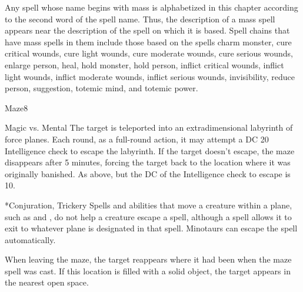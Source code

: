 \par Any spell whose name begins with mass is alphabetized in this chapter according to the second word of the spell name. Thus, the description of a mass spell appears near the description of the spell on which it is based. Spell chains that have mass spells in them include those based on the spells charm monster, cure critical wounds, cure light wounds, cure moderate wounds, cure serious wounds, enlarge person, heal, hold monster, hold person, inflict critical wounds, inflict light wounds, inflict moderate wounds, inflict serious wounds, invisibility, reduce person, suggestion, totemic mind, and totemic power.

\begin{spellsection}{Maze}{8}
    \begin{spellheader}
    \end{spellheader}
    \begin{spellcontent}
        \begin{spelltargetinginfo}
        \end{spelltargetinginfo}
        \begin{spelleffects}
            \begin{spellattack}{Magic vs. Mental}
                \spellsuccess The target is teleported into an extradimensional labyrinth of force planes. Each round, as a full-round action, it may attempt a DC 20 Intelligence check to escape the labyrinth. If the target doesn't escape, the maze disappears after 5 minutes, forcing the target back to the location where it was originally banished.
                \spellfailure As above, but the DC of the Intelligence check to escape is 10.
            \end{spellattack}
        \end{spelleffects}
    \end{spellcontent}
    \begin{spellfooter}
        *{Conjuration, Trickery}
        \spellnotes Spells and abilities that move a creature within a plane, such as  and , do not help a creature escape a  spell, although a  spell allows it to exit to whatever plane is designated in that spell. Minotaurs can escape the spell automatically.

        When leaving the maze, the target reappears where it had been when the maze spell was cast. If this location is filled with a solid object, the target appears in the nearest open space.

        \norepeatspellnotes
        \miscastrandom
    \end{spellfooter}
\end{spellsection}

